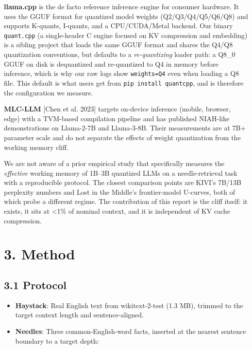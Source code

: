 \documentclass[11pt]{article}
\begin{document}
\textbf{llama.cpp} is the de facto reference inference engine for consumer hardware. It uses the GGUF format for quantized model weights (Q2/Q3/Q4/Q5/Q6/Q8) and supports K-quants, I-quants, and a CPU/CUDA/Metal backend. Our binary \texttt{quant.cpp} (a single-header C engine focused on KV compression and embedding) is a sibling project that loads the same GGUF format and shares the Q4/Q8 quantization conventions, but defaults to a \textit{re-quantizing} loader path: a Q8\_0 GGUF on disk is dequantized and re-quantized to Q4 in memory before inference, which is why our raw logs show \texttt{weights=Q4} even when loading a Q8 file. This default is what users get from \texttt{pip install quantcpp}, and is therefore the configuration we measure.


\textbf{MLC-LLM} [Chen et al. 2023] targets on-device inference (mobile, browser, edge) with a TVM-based compilation pipeline and has published NIAH-like demonstrations on Llama-2-7B and Llama-3-8B. Their measurements are at 7B+ parameter scale and do not separate the effects of weight quantization from the working memory cliff.


We are not aware of a prior empirical study that specifically measures the \textit{effective} working memory of 1B–3B quantized LLMs on a needle-retrieval task with a reproducible protocol. The closest comparison points are KIVI's 7B/13B perplexity numbers and Lost in the Middle's frontier-model U-curves, both of which probe a different regime. The contribution of this report is the cliff itself: it exists, it sits at <1\% of nominal context, and it is independent of KV cache compression.


\section*{3. Method}


\subsection*{3.1 Protocol}


\begin{itemize}
\item \textbf{Haystack}: Real English text from wikitext-2-test (1.3 MB), trimmed to the target context length and sentence-aligned.
\item \textbf{Needles}: Three common-English-word facts, inserted at the nearest sentence boundary to a target depth:
\end{itemize}
\end{document}
